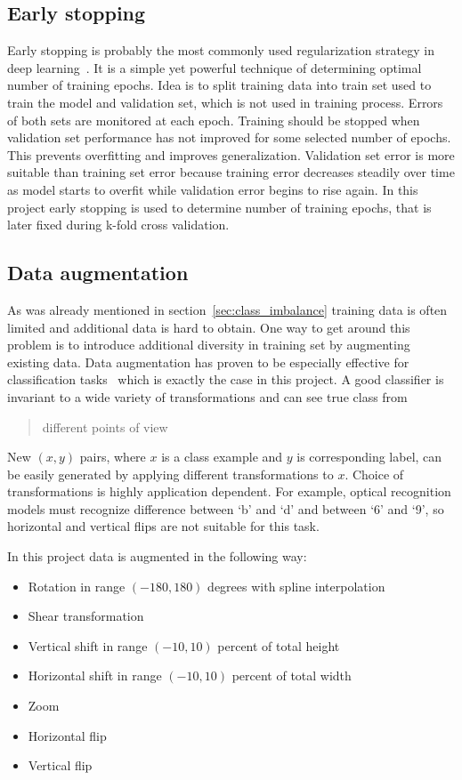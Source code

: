 \documentclass[a4paper, 11pt, table]{article}
\begin{document}
\subsection{Early stopping}
Early stopping is probably the most commonly used regularization strategy in deep learning~\cite{dl_book}. It is a simple yet powerful technique of determining optimal number of training epochs. Idea is to split training data into train set used to train the model and validation set, which is not used in training process. Errors of both sets are monitored at each epoch. Training should be stopped when validation set performance has not improved for some selected number of epochs. This prevents overfitting and improves generalization. Validation set error is more suitable than training set error because training error decreases steadily over time as model starts to overfit while validation error begins to rise again. 
In this project early stopping is used to determine number of training epochs, that is later fixed during k-fold cross validation.

\subsection{Data augmentation}
\label{sec:data_augmentation}
As was already mentioned in section~\ref{sec:class_imbalance} training data is often limited and additional data is hard to obtain. One way to get around this problem is to introduce additional diversity in training set by augmenting existing data. Data augmentation has proven to be especially effective for classification tasks~\cite{dl_book} which is exactly the case in this project. 
A good classifier is invariant to a wide variety of transformations and can see true class from \blockquote{different points of view}. New $(x, y)$ pairs, where $x$ is a class example and $y$ is corresponding label, can be easily generated by applying different transformations to $x$. Choice of transformations is highly application dependent. For example, optical recognition models must recognize difference between `b' and `d' and between `6' and `9', so horizontal and vertical flips are not suitable for this task. 
 

In this project data is augmented in the following way:
\begin{itemize}
\item Rotation in range $(-180, 180)$ degrees with spline interpolation
\item Shear transformation
\item Vertical shift in range $(-10, 10)$ percent of total height
\item Horizontal shift in range $(-10, 10)$ percent of total width
\item Zoom
\item Horizontal flip
\item Vertical flip
\end{itemize}
\end{document}
